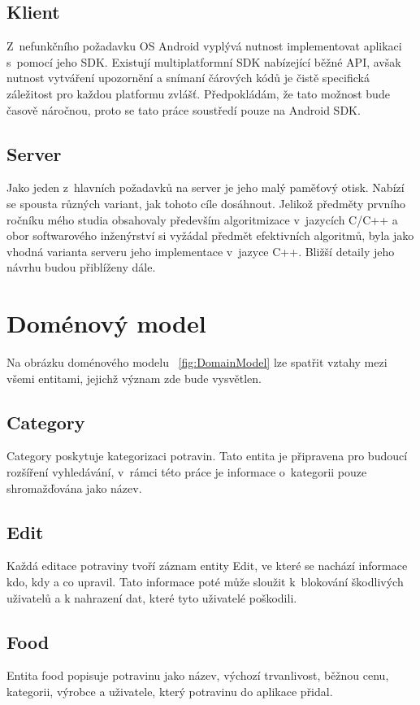 \documentclass[thesis=B,czech]{FITthesis}[2013/10/20]
\begin{document}
\subsection{Klient}

Z~nefunkčního požadavku OS Android vyplývá nutnost implementovat aplikaci s~pomocí jeho SDK. Existují multiplatformní SDK nabízející běžné API, avšak nutnost vytváření upozornění a snímaní čárových kódů je čistě specifická záležitost pro každou platformu zvlášť. Předpokládám, že tato možnost bude časově náročnou, proto se tato práce soustředí pouze na Android SDK.

\subsection{Server}

Jako jeden z~hlavních požadavků na server je jeho malý paměťový otisk. Nabízí se spousta různých variant, jak tohoto cíle dosáhnout. Jelikož předměty prvního ročníku mého studia obsahovaly především algoritmizace v~jazycích C/C++ a obor softwarového inženýrství si vyžádal předmět efektivních algoritmů, byla jako vhodná varianta serveru jeho implementace v~jazyce C++. Bližší detaily jeho návrhu budou přiblíženy dále.

\section{Doménový model}

Na obrázku doménového modelu ~\ref{fig:DomainModel} lze spatřit vztahy mezi všemi entitami, jejichž význam zde bude vysvětlen.

\subsection{Category}
Category poskytuje kategorizaci potravin. Tato entita je připravena pro budoucí rozšíření vyhledávání, v~rámci této práce je informace o~kategorii pouze shromažďována jako název.

\subsection{Edit}
Každá editace potraviny tvoří záznam entity Edit, ve které se nachází informace kdo, kdy a co upravil. Tato informace poté může sloužit k~blokování škodlivých uživatelů a k nahrazení dat, které tyto uživatelé poškodili.

\subsection{Food}
Entita food popisuje potravinu jako název, výchozí trvanlivost, běžnou cenu, kategorii, výrobce a uživatele, který potravinu do aplikace přidal.
\end{document}
